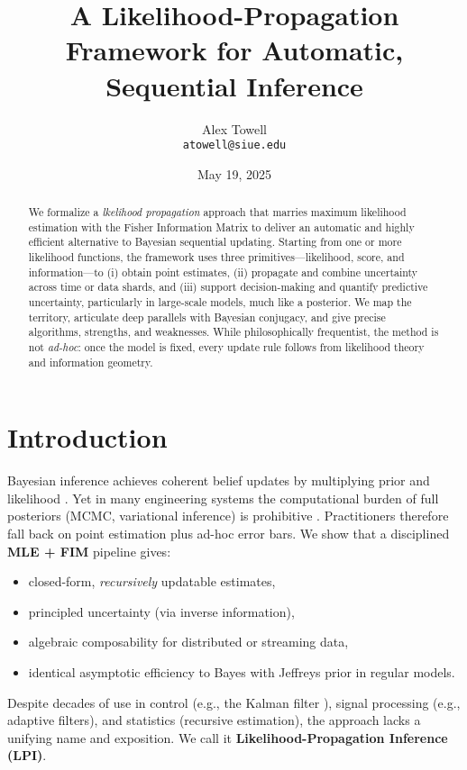 \documentclass[11pt]{article}
\title{A Likelihood-Propagation Framework for Automatic, Sequential Inference}
\author{Alex Towell \\ \texttt{atowell@siue.edu}}
\date{May 19, 2025}
\begin{document}
\maketitle

\begin{abstract}
We formalize a \textit{lkelihood propagation} approach that marries maximum likelihood estimation with the Fisher Information Matrix to deliver an automatic and highly efficient alternative to Bayesian sequential updating. Starting from one or more likelihood functions, the framework uses three primitives---likelihood, score, and information---to (i) obtain point estimates, (ii) propagate and combine uncertainty across time or data shards, and (iii) support decision-making and quantify predictive uncertainty, particularly in large-scale models, much like a posterior. We map the territory, articulate deep parallels with Bayesian conjugacy, and give precise algorithms, strengths, and weaknesses. While philosophically frequentist, the method is not \textit{ad-hoc}: once the model is fixed, every update rule follows from likelihood theory and information geometry.
\end{abstract}

\section{Introduction}
Bayesian inference achieves coherent belief updates by multiplying prior and likelihood \cite{gelman2013bayesian}.
Yet in many engineering systems the computational burden of full posteriors (MCMC, variational inference) is prohibitive \cite{blei2017variational}. Practitioners therefore fall back on point estimation plus ad-hoc error bars. We show that a disciplined \textbf{MLE + FIM} pipeline gives:

\begin{itemize}
\item closed-form, \textit{recursively} updatable estimates,
\item principled uncertainty (via inverse information),
\item algebraic composability for distributed or streaming data,
\item identical asymptotic efficiency to Bayes with Jeffreys prior in regular models.
\end{itemize}

Despite decades of use in control (e.g., the Kalman filter \cite{kalman1960new}), signal processing (e.g., adaptive filters), and statistics (recursive estimation), the approach lacks a unifying name and exposition. We call it \textbf{Likelihood-Propagation Inference (LPI)}.
\end{document}
